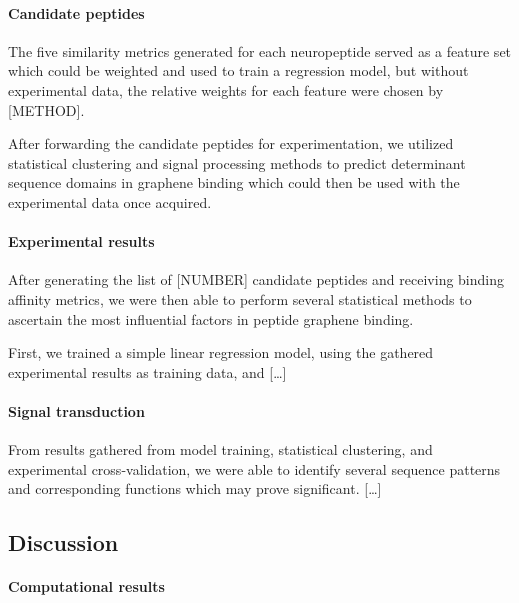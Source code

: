 \documentclass[]{article}
\let\oldparagraph\paragraph
\renewcommand{\paragraph}[1]{\oldparagraph{#1}\mbox{}}
\begin{document}
\hypertarget{candidate-peptides}{%
\paragraph{Candidate peptides}\label{candidate-peptides}}

The five similarity metrics generated for each neuropeptide served as a feature set which could be weighted and used to train a regression model, but without experimental data, the relative weights for each feature were chosen by {[}METHOD{]}.

After forwarding the candidate peptides for experimentation, we utilized statistical clustering and signal processing methods to predict determinant sequence domains in graphene binding which could then be used with the experimental data once acquired.

\hypertarget{experimental-results}{%
\paragraph{Experimental results}\label{experimental-results}}

After generating the list of {[}NUMBER{]} candidate peptides and receiving binding affinity metrics, we were then able to perform several statistical methods to ascertain the most influential factors in peptide graphene binding.

First, we trained a simple linear regression model, using the gathered
experimental results as training data, and {[}\ldots{}{]}

\hypertarget{signal-transduction}{%
\paragraph{Signal transduction}\label{signal-transduction}}

From results gathered from model training, statistical clustering, and experimental cross-validation, we were able to identify several sequence patterns and corresponding functions which may prove significant.
{[}\ldots{}{]}

\hypertarget{discussion}{%
\subsection{Discussion}\label{discussion}}

\hypertarget{computational-results}{%
\paragraph{Computational results}\label{computational-results}}
\end{document}
